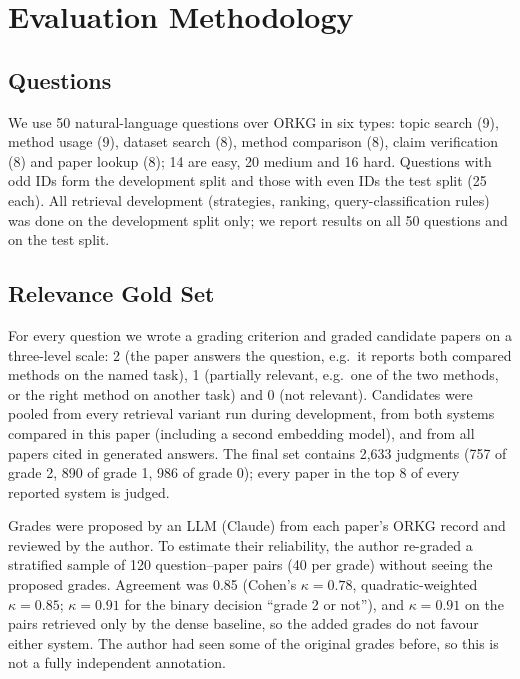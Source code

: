 
\section{Evaluation Methodology}
\label{sec:method}

\subsection{Questions}

We use 50 natural-language questions over ORKG in six types:
topic search (9), method usage (9), dataset search (8), method comparison (8),
claim verification (8) and paper lookup (8); 14 are easy, 20 medium and 16 hard.
Questions with odd IDs form the development split and those with even IDs
the test split (25 each). All retrieval development (strategies, ranking,
query-classification rules) was done on the development split only; we report
results on all 50 questions and on the test split.

\subsection{Relevance Gold Set}

For every question we wrote a grading criterion and graded candidate papers
on a three-level scale: 2 (the paper answers the question, e.g.\ it reports
both compared methods on the named task), 1 (partially relevant, e.g.\ one of
the two methods, or the right method on another task) and 0 (not relevant).
Candidates were pooled from every retrieval variant run during development,
from both systems compared in this paper (including a second embedding model),
and from all papers cited in generated answers. The final set contains 2,633
judgments (757 of grade 2, 890 of grade 1, 986 of grade 0); every paper in the
top 8 of every reported system is judged.

Grades were proposed by an LLM (Claude) from each paper's ORKG record and
reviewed by the author. To estimate their reliability, the author re-graded a
stratified sample of 120 question--paper pairs (40 per grade) without seeing
the proposed grades. Agreement was 0.85 (Cohen's $\kappa = 0.78$, quadratic-weighted
$\kappa = 0.85$; $\kappa = 0.91$ for the binary decision ``grade 2 or not''),
and $\kappa = 0.91$ on the pairs retrieved only by the dense baseline, so the
added grades do not favour either system. The author had seen some of the
original grades before, so this is not a fully independent annotation.

